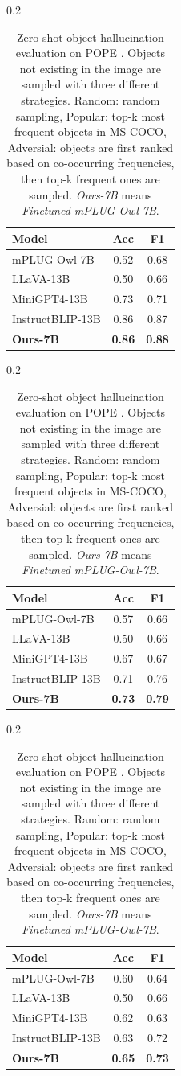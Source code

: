 \vspace{-0.1in}
\begin{table}[t]
\begin{subtable}[t]{0.2\textwidth}
\small
\begin{tabular}{lcc}
\toprule[1.5pt]
Model & Acc & F1\\
\midrule
mPLUG-Owl-7B & 0.52 & 0.68 \\
LLaVA-13B & 0.50 & 0.66 \\
MiniGPT4-13B & 0.73 & 0.71\\
InstructBLIP-13B & 0.86 & 0.87 \\
\textbf{Ours-7B} & \textbf{0.86} & \textbf{0.88} \\
\bottomrule[1.5pt]
\end{tabular}
 \caption{Random Set.}
\label{tab:stat1}
\end{subtable}
\hspace{0.8in}
\begin{subtable}[t]{0.2\textwidth}
\setlength\tabcolsep{4.7pt}
\centering
\small
\begin{tabular}{lcc}
\toprule[1.5pt]
Model & Acc & F1\\
\midrule
mPLUG-Owl-7B & 0.57 & 0.66 \\
LLaVA-13B & 0.50 & 0.66 \\
MiniGPT4-13B & 0.67 & 0.67\\
InstructBLIP-13B & 0.71 & 0.76 \\
\textbf{Ours-7B} & \textbf{0.73} & \textbf{0.79} \\
\bottomrule[1.5pt]
\end{tabular}
\caption{
Popular Set.}
\label{tab:stat2}
\end{subtable}
\hspace{0.7in}
\begin{subtable}[t]{0.2\textwidth}
\setlength\tabcolsep{4.7pt}
\centering
\small
\begin{tabular}{lcc}
\toprule[1.5pt]
Model & Acc & F1\\
\midrule
mPLUG-Owl-7B & 0.60 & 0.64 \\
LLaVA-13B & 0.50 & 0.66 \\
MiniGPT4-13B & 0.62 & 0.63\\
InstructBLIP-13B & 0.63 & 0.72 \\
\textbf{Ours-7B} & \textbf{0.65} & \textbf{0.73} \\
\bottomrule[1.5pt]
\end{tabular}
\caption{Adversarial Set.}
\label{tab:stat2}
\end{subtable}
\vspace{-2mm}
\caption{Zero-shot object hallucination evaluation on POPE \citep{li2023evaluating}. Objects not existing in the image are sampled with three different strategies. Random: random sampling, Popular: top-k most frequent objects in MS-COCO, Adversial: objects are first ranked based on co-occurring frequencies, then top-k frequent ones are sampled. \textit{Ours-7B} means \textit{Finetuned mPLUG-Owl-7B}.
}
\label{tab:pope}
\vspace{-0.2in}
\end{table}



